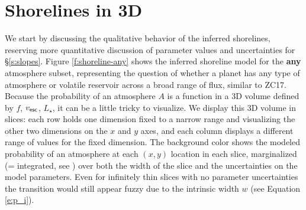 \documentclass[modern,linenumbers,trackchanges]{aastex7}
\begin{document}
\section{Shorelines in 3D}
\label{s:shorelines}

We start by discussing the qualitative behavior of the inferred shorelines, reserving more quantitative discussion of parameter values and uncertainties for \S\ref{s:slopes}. Figure \ref{f:shoreline-any} shows the inferred shoreline model for the {\bf any} atmosphere subset, representing the question of whether a planet has any type of atmosphere or volatile reservoir across a broad range of flux, similar to ZC17. Because the probability of an atmosphere $A$ is a function in a 3D volume defined by $f$, $v_{\sf esc}$, $L_\star$, it can be a little tricky to visualize. We display this 3D volume in slices: each row holds one dimension fixed to a narrow range and visualizing the other two dimensions on the $x$ and $y$ axes, and each column displays a different range of values for the fixed dimension. The background color shows the modeled probability of an atmosphere at each $(x, y)$ location in each slice, marginalized (= integrated, see \citealt{hoggDataAnalysisRecipes2010a, siviaDataAnalysisBayesian2011, vanderplasFrequentismBayesianismPythondriven2014a, ivezicStatisticsDataMining2020}) over both the width of the slice and the uncertainties on the model parameters. Even for infinitely thin slices with no parameter uncertainties the transition would still appear fuzzy due to the intrinsic width $w$ (see Equation \ref{e:p_i}). 
\end{document}
